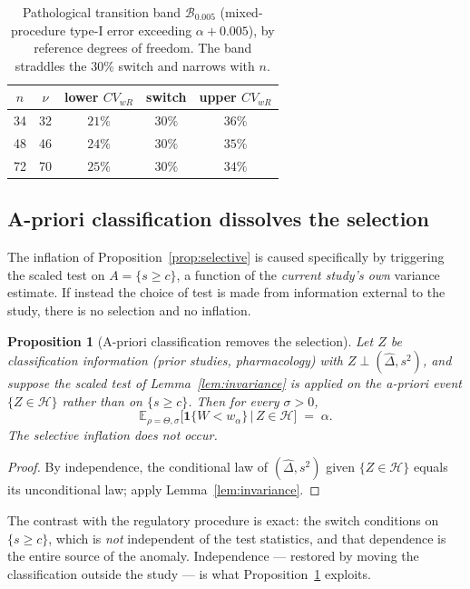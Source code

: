 \documentclass[11pt]{article}
\newtheorem{proposition}{Proposition}
\theoremstyle{remark}
\newcommand{\Dhat}{\hat{\Delta}}
\newcommand{\E}{\mathbb{E}}
\newcommand{\ind}{\mathbf{1}}
\begin{document}
\begin{table}[t]
\centering
\caption{Pathological transition band $\mathcal{B}_{0.005}$ (mixed-procedure type-I error exceeding $\alpha+0.005$), by reference degrees of freedom. The band straddles the $30\%$ switch and narrows with $n$.}
\label{tab:band}
\begin{tabular}{ccccc}
\toprule
$n$ & $\nu$ & lower $CV_{wR}$ & switch & upper $CV_{wR}$ \\
\midrule
34 & 32 & $21\%$ & $30\%$ & $36\%$ \\
48 & 46 & $24\%$ & $30\%$ & $35\%$ \\
72 & 70 & $25\%$ & $30\%$ & $34\%$ \\
\bottomrule
\end{tabular}
\end{table}

\subsection{A-priori classification dissolves the selection}
The inflation of Proposition~\ref{prop:selective} is caused specifically by triggering the scaled test on $A=\{s\ge c\}$, a function of the \emph{current study's own} variance estimate. If instead the choice of test is made from information external to the study, there is no selection and no inflation.

\begin{proposition}[A-priori classification removes the selection]\label{prop:apriori}
Let $Z$ be classification information (prior studies, pharmacology) with $Z\perp(\Dhat,s^2)$, and suppose the scaled test of Lemma~\ref{lem:invariance} is applied on the a-priori event $\{Z\in\mathcal{H}\}$ rather than on $\{s\ge c\}$. Then for every $\sigma>0$,
\[
\E_{\rho=\Theta,\sigma}\big[\ind\{W<w_\alpha\}\,\big|\,Z\in\mathcal{H}\big]\;=\;\alpha .
\]
The selective inflation does not occur.
\end{proposition}

\begin{proof}
By independence, the conditional law of $(\Dhat,s^2)$ given $\{Z\in\mathcal{H}\}$ equals its unconditional law; apply Lemma~\ref{lem:invariance}.
\end{proof}

The contrast with the regulatory procedure is exact: the switch conditions on $\{s\ge c\}$, which is \emph{not} independent of the test statistics, and that dependence is the entire source of the anomaly. Independence --- restored by moving the classification outside the study --- is what Proposition~\ref{prop:apriori} exploits.
\end{document}
